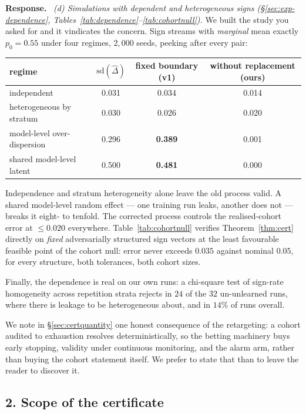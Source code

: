 \documentclass[11pt,a4paper]{article}
\newenvironment{reply}{%
  \par\smallskip\noindent\textbf{\color{acol}Response.}\ \begingroup}{\endgroup\par}
\begin{document}
\begin{reply}
\emph{(d) Simulations with dependent and heterogeneous signs (\S\ref{sec:exp-dependence}, Tables~\ref{tab:dependence}--\ref{tab:cohortnull}).}
We built the study you asked for and it vindicates the concern. Sign streams with
\emph{marginal} mean exactly $p_0=0.55$ under four regimes, $2{,}000$ seeds, peeking
after every pair:

\begin{center}\small
\begin{tabular}{lccc}
\toprule
regime & $\mathrm{sd}(\hat\Delta)$ & fixed boundary (v1) & without replacement (ours)\\
\midrule
independent                & 0.031 & 0.034 & 0.014\\
heterogeneous by stratum   & 0.030 & 0.026 & 0.020\\
model-level over-dispersion& 0.296 & \textbf{0.389} & 0.001\\
shared model-level latent   & 0.500 & \textbf{0.481} & 0.000\\
\bottomrule
\end{tabular}
\end{center}

\noindent Independence and stratum heterogeneity alone leave the old process valid.
A shared model-level random effect --- one training run leaks, another does not --- breaks
it eight- to tenfold. The corrected process controls the realised-cohort error at
$\le 0.020$ everywhere. Table~\ref{tab:cohortnull} verifies Theorem~\ref{thm:cert} directly on \emph{fixed}
adversarially structured sign vectors at the least favourable feasible point of the
cohort null: error never exceeds $0.035$ against nominal $0.05$, for every structure,
both tolerances, both cohort sizes.

Finally, the dependence is real on our own runs: a chi-square test of sign-rate
homogeneity across repetition strata rejects in $24$ of the $32$ un-unlearned runs,
where there is leakage to be heterogeneous about, and in $14\%$ of runs overall.

We note in \S\ref{sec:certquantity} one honest consequence of the retargeting: a cohort audited to
exhaustion resolves deterministically, so the betting machinery buys early stopping,
validity under continuous monitoring, and the alarm arm, rather than buying the cohort
statement itself. We prefer to state that than to leave the reader to discover it.
\end{reply}

\subsection*{2. Scope of the certificate}
\end{document}
